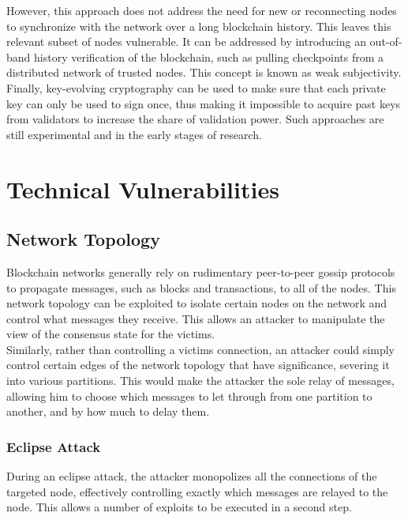 \documentclass[12pt,a4paper]{article}
\begin{document}
However, this approach does not address the need for new or reconnecting nodes to synchronize with the network over a long blockchain history. This leaves this relevant subset of nodes vulnerable. It can be addressed by introducing an out-of-band history verification of the blockchain, such as pulling checkpoints from a distributed network of trusted nodes. This concept is known as weak subjectivity.\\

Finally, key-evolving cryptography can be used to make sure that each private key can only be used to sign once, thus making it impossible to acquire past keys from validators to increase the share of validation power. Such approaches are still experimental and in the early stages of research.\\

\section{Technical Vulnerabilities}

\subsection{Network Topology}

Blockchain networks generally rely on rudimentary peer-to-peer gossip protocols to propagate messages, such as blocks and transactions, to all of the nodes. This network topology can be exploited to isolate certain nodes on the network and control what messages they receive. This allows an attacker to manipulate the view of the consensus state for the victims.\\

Similarly, rather than controlling a victims connection, an attacker could simply control certain edges of the network topology that have significance, severing it into various partitions. This would make the attacker the sole relay of messages, allowing him to choose which messages to let through from one partition to another, and by how much to delay them.\\

\subsubsection{Eclipse Attack}

During an eclipse attack, the attacker monopolizes all the connections of the targeted node, effectively controlling exactly which messages are relayed to the node. This allows a number of exploits to be executed in a second step.\\
\end{document}

